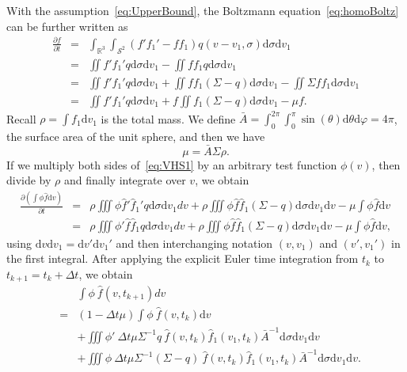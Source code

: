 \documentclass[12pt]{amsart}
\newcommand{\bbR}{\mathbb R} \newcommand{\bbS}{\mathbb S}
\newcommand{\cS}{\mathcal S} \newcommand{\cT}{\mathcal T}
\newcommand{\Rthree}{{\bbR^3}}
\newcommand{\Stwo}{{\cS^2}}
\newcommand{\rd}{\mathrm{d}}
\begin{document}
With the assumption~\eqref{eq:UpperBound}, the Boltzmann equation~\eqref{eq:homoBoltz} can be further written as
\begin{eqnarray}
    \frac{\partial f}{\partial t}   &= & \int_{\Rthree}\int_\Stwo \left(f'f_1' - f f_1\right)  q (v-v_1,\sigma) \rd \sigma \rd v_1 \nonumber \\
    & =& \iint f'f_1' q  \rd \sigma \rd v_1 - \iint ff_1 q  \rd\sigma \rd v_1\nonumber  \\
    & = & \iint f'f_1' q  \rd \sigma \rd v_1  + \iint ff_1 (\Sigma  - q)  \rd\sigma \rd v_1  - \iint \Sigma  ff_1 \rd\sigma \rd v_1 \nonumber\\
    &=& \iint f'f_1' q  \rd \sigma \rd v_1  + f \iint f_1 (\Sigma - q)  \rd \sigma \rd v_1  - \mu f. 
 \label{eq:VHS1}
\end{eqnarray}
Recall $\rho = \int f_1 \rd v_1$ is the total mass. We define ${\bar A} = \int_{0}^{2\pi}\int_{0}^{\pi} \sin(\theta) \rd \theta \rd \varphi = 4\pi$, the surface area of the unit sphere, and then we have
\begin{equation} \label{eq:mu}
\mu = {\bar A} \Sigma \rho.
\end{equation}
If we multiply both sides of~\eqref{eq:VHS1} by an arbitrary test function $\phi(v)$, then divide by $\rho$ and finally integrate over $v$, we obtain 
\begin{eqnarray*}
       \frac{\partial ( \int \phi \hat f \rd v)}{\partial t}  &= & \rho \iiint  \phi \hat f' \hat f_1' q  \rd \sigma \rd v_1 dv + \rho \iiint \phi \hat f \hat f_1 (\Sigma  - q)  \rd \sigma \rd  v_1 \rd v -  \mu \int  \phi \hat f \rd  v\\
       & = &\rho \iiint  \phi' \hat f \hat f_1 q  \rd  \sigma  \rd 
 v_1 dv +\rho \iiint  \phi \hat f \hat f_1 (\Sigma  - q)  \rd  \sigma \rd  v_1 \rd  v -  \mu \int  \phi \hat f \rd v,
\end{eqnarray*}
using $\rd v \rd v_1=\rd v' \rd  v_1' $ and then interchanging notation $(v,v_1)$ and $(v',v_1')$ in the first integral.
After applying the explicit Euler time integration from $t_k$ to $t_{k+1} = t_k + \Delta t$, we obtain
\begin{eqnarray}
     && \int \phi\ \hat f (v,t_{k+1}) dv \nonumber \\
       &=&   (1-\Delta t \mu ) \int \phi\ \hat f(v,t_{k}) \rd v  \label{eq:non_collide} \\
        &&  + \iiint  \phi'  \ {\Delta t \mu \Sigma^{-1}  {q}} \  \hat f(v,t_{k})  \hat f_1(v_1,t_{k})   {\bar A}^{-1} \rd 
        \sigma \rd  v_1 \rd v  \label{eq:collide} \\
       &&  +  \iiint \phi\ {\Delta t  \mu \Sigma^{-1} (\Sigma -q)} \  \hat f(v,t_{k})  \hat f_1(v_1,t_{k})  {\bar A}^{-1} \rd 
        \sigma \rd  v_1 \rd v. \label{eq:v_collide}
\end{eqnarray}
\end{document}
